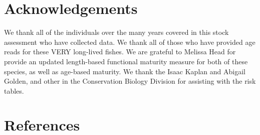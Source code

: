 \documentclass[
]{scrartcl}
\begin{document}
\newpage{}

\section{Acknowledgements}\label{sec-acknowledgements}

We thank all of the individuals over the many years covered in this
stock assessment who have collected data. We thank all of those who have
provided age reads for these VERY long-lived fishes. We are grateful to
Melissa Head for provide an updated length-based functional maturity
measure for both of these species, as well as age-based maturity. We
thank the Isaac Kaplan and Abigail Golden, and other in the Conservation
Biology Division for assisting with the risk tables.

\newpage{}

\section{References}\label{references}
\end{document}
